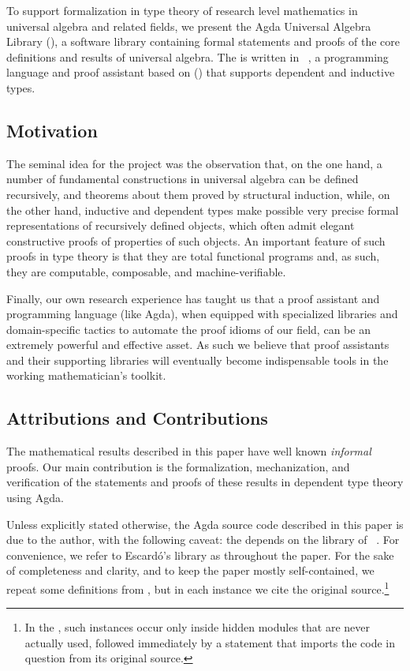To support formalization in type theory of research level mathematics in universal algebra and related fields, we present the Agda Universal Algebra Library (\agdaualib), a software library containing formal statements and proofs of the core definitions and results of universal algebra. The \ualib is written in \agda~\cite{Norell:2009}, a programming language and proof assistant based on \MLTT (\mltt) that supports dependent and inductive types.


\subsection{Motivation}\label{sec:motivation}
The seminal idea for the \agdaualib project was the observation that, on the one hand, a number of fundamental constructions in universal algebra can be defined recursively, and theorems about them proved by structural induction, while, on the other hand, inductive and dependent types make possible very precise formal representations of recursively defined objects, which often admit elegant constructive proofs of properties of such objects.  An important feature of such proofs in type theory is that they are total functional programs and, as such, they are computable, composable, and machine-verifiable.

Finally, our own research experience has taught us that a proof assistant and programming language (like Agda), when equipped with specialized libraries and domain-specific tactics to automate the proof idioms of our field, can be an extremely powerful and effective asset. As such we believe that proof assistants and their supporting libraries will eventually become indispensable tools in the working mathematician's toolkit.

\subsection{Attributions and Contributions}\label{sec:contributions}
The mathematical results described in this paper have well known \emph{informal} proofs. Our main contribution is the formalization, mechanization, and verification of the statements and proofs of these results in dependent type theory using Agda.

Unless explicitly stated otherwise, the Agda source code described in this paper is due to the author, with the following caveat: the \ualib depends on the \typetopology library of \MartinEscardo~\cite{MHE}. For convenience, we refer to Escard\'o's library as \typtop throughout the paper. For the sake of completeness and clarity, and to keep the paper mostly self-contained, we repeat some definitions from \typtop, but in each instance we cite the original source.\footnote{In the \ualib, such instances occur only inside hidden modules that are never actually used, followed immediately by a statement that imports the code in question from its original source.}
